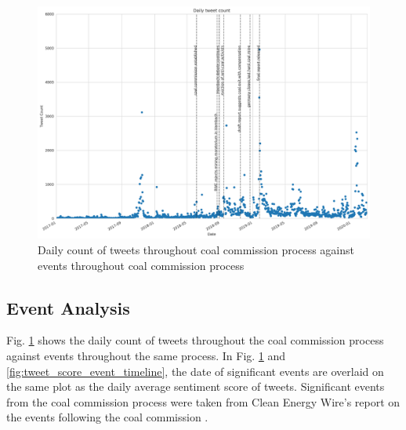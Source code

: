 \documentclass[12pt,onecolumn,twoside]{layout}
\begin{document}
\begin{figure}
	\begin{center}
		\includegraphics[width=\textwidth]{figures/sa_tweet_count_event_timeline3}
	\end{center}
	\caption{Daily count of tweets throughout coal commission process against events throughout coal commission process}
	\label{fig:tweet_count_event_timeline}
\end{figure}


\subsection*{Event Analysis}
Fig. \ref{fig:tweet_count_event_timeline} shows the daily count of tweets throughout the coal commission process against events throughout the same process. In Fig. \ref{fig:tweet_count_event_timeline} and \ref{fig:tweet_score_event_timeline}, the date of significant events are overlaid on the same plot as the daily average sentiment score of tweets. Significant events from the coal commission process were taken from Clean Energy Wire's report on the events following the coal commission \cite{Amelang2019}. 
 
\end{document}
